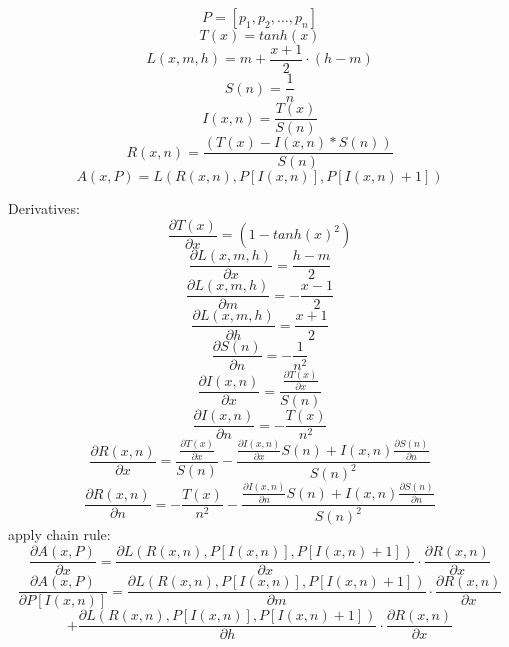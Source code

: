 \documentclass[a4paper]{article}
\begin{document}
	

	\[
	P=[p_1, p_2, \ldots, p_n]
	\]
    \[
    T(x)=tanh(x)
    \]
	\[
	L(x,m,h)= m + \frac{x + 1}{2} \cdot (h - m)
	\]
	\[
	S(n)=\frac{1}{n}
	\]
	\[
	I(x,n)=\frac{T(x)}{S(n)}
	\]
	\[
	R(x,n)=\frac{(T(x)-I(x,n)*S(n))}{S(n)}
	\]
	\[
	A(x,P)=L(R(x,n),P[I(x,n)],P[I(x,n)+1])
	\]

	Derivatives:
	\[
	\frac{\partial T(x)}{\partial x}=(1-tanh(x)^2)
	\]
	\[
	\frac{\partial L(x,m,h)}{\partial x}= \frac{h-m}{2}
	\]
	\[
	\frac{\partial L(x,m,h)}{\partial m}=-\frac{x-1}{2}
	\]
	\[
	\frac{\partial L(x,m,h)}{\partial h}= \frac{x+1}{2}
	\]
	\[
	\frac{\partial S(n)}{\partial n}=-\frac{1}{n^2}
	\]
	\[
	\frac{\partial I(x,n)}{\partial x}=\frac{\frac{\partial T(x)}{\partial x}}{S(n)}
	\]
	\[
	\frac{\partial I(x,n)}{\partial n}=-\frac{T(x)}{n^2}
	\]
	\[
	\frac{\partial R(x,n)}{\partial x}=\frac{\frac{\partial T(x)}{\partial x}}{S(n)}-\frac{\frac{\partial I(x,n)}{\partial x}S(n)+I(x,n)\frac{\partial S(n)}{\partial n}}{S(n)^2}
	\]
	\[
	\frac{\partial R(x,n)}{\partial n}=-\frac{T(x)}{n^2}-\frac{\frac{\partial I(x,n)}{\partial n}S(n)+I(x,n)\frac{\partial S(n)}{\partial n}}{S(n)^2}
	\]
	apply chain rule:
	\[
	\frac{\partial A(x,P)}{\partial x}=\frac{\partial L(R(x,n),P[I(x,n)],P[I(x,n)+1])}{\partial x} \cdot \frac{\partial R(x,n)}{\partial x}
	\]
	\[
	\frac{\partial A(x,P)}{\partial P[I(x,n)]}=\frac{\partial L(R(x,n),P[I(x,n)],P[I(x,n)+1])}{\partial m} \cdot \frac{\partial R(x,n)}{\partial x}
	\]
	\[
	+\frac{\partial L(R(x,n),P[I(x,n)],P[I(x,n)+1])}{\partial h} \cdot \frac{\partial R(x,n)}{\partial x}
	\]
\end{document}
